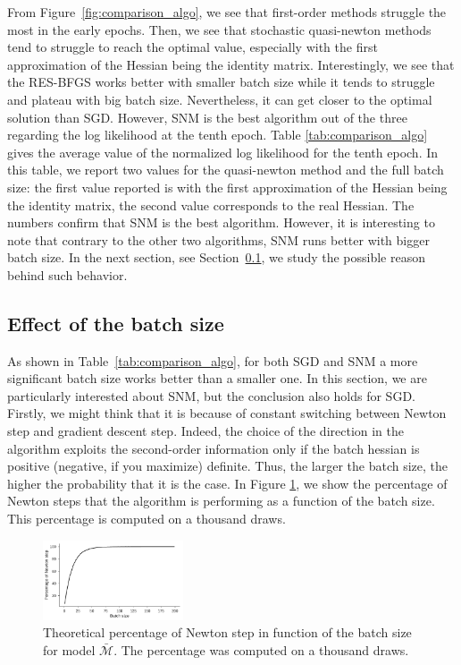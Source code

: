 \documentclass[conference]{IEEEtran}
\begin{document}
From Figure~\ref{fig:comparison_algo}, we see that first-order methods struggle the most in the early epochs. Then, we see that stochastic quasi-newton methods tend to struggle to reach the optimal value, especially with the first approximation of the Hessian being the identity matrix. Interestingly, we see that the RES-BFGS works better with smaller batch size while it tends to struggle and plateau with big batch size. Nevertheless, it can get closer to the optimal solution than SGD. However, SNM is the best algorithm out of the three regarding the log likelihood at the tenth epoch. Table \ref{tab:comparison_algo} gives the average value of the normalized log likelihood for the tenth epoch. In this table, we report two values for the quasi-newton method and the full batch size: the first value reported is with the first approximation of the Hessian being the identity matrix, the second value corresponds to the real Hessian. The numbers confirm that SNM is the best algorithm. However, it is interesting to note that contrary to the other two algorithms, SNM runs better with bigger batch size. In the next section, see Section~\ref{sec:effect_bs}, we study the possible reason behind such behavior.

\subsection{Effect of the batch size}
\label{sec:effect_bs}

As shown in Table~\ref{tab:comparison_algo}, for both SGD and SNM a more significant batch size works better than a smaller one. In this section, we are particularly interested about SNM, but the conclusion also holds for SGD. Firstly, we might think that it is because of constant switching between Newton step and gradient descent step. Indeed, the choice of the direction in the algorithm exploits the second-order information only if the batch hessian is positive (negative, if you maximize) definite. Thus, the larger the batch size, the higher the probability that it is the case. In Figure \ref{fig:perc_newton}, we show the percentage of Newton steps that the algorithm is performing as a function of the batch size. This percentage is computed on a thousand draws. \\

\begin{figure}[t]
\centering
\includegraphics[width=0.37\textwidth]{../figures/perc_newton.pdf}
\vspace{-0.3cm}
\caption{Theoretical percentage of Newton step in function of the batch size for model $\bar{\mathcal{M}}$. The percentage was computed on a thousand draws.}
\label{fig:perc_newton}
\vspace{-0.3cm}
\end{figure}
\end{document}
